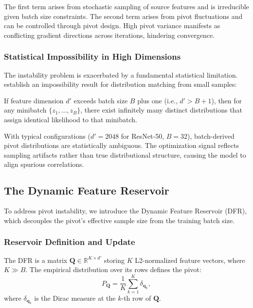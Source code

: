 The first term arises from stochastic sampling of source features and is irreducible given batch size constraints. The second term arises from pivot fluctuations and can be controlled through pivot design. High pivot variance manifests as conflicting gradient directions across iterations, hindering convergence.

\subsubsection{Statistical Impossibility in High Dimensions}

The instability problem is exacerbated by a fundamental statistical limitation. \citet{dong2025distribution} establish an impossibility result for distribution matching from small samples:

\begin{theorem}
\label{thm:impossibility}
If feature dimension $d'$ exceeds batch size $B$ plus one (i.e., $d' > B + 1$), then for any minibatch $\{z_1, \dots, z_B\}$, there exist infinitely many distinct distributions that assign identical likelihood to that minibatch.
\end{theorem}

With typical configurations ($d' = 2048$ for ResNet-50, $B = 32$), batch-derived pivot distributions are statistically ambiguous. The optimization signal reflects sampling artifacts rather than true distributional structure, causing the model to align spurious correlations.

\subsection{The Dynamic Feature Reservoir}
\label{ssec:dfr}

To address pivot instability, we introduce the Dynamic Feature Reservoir (DFR), which decouples the pivot's effective sample size from the training batch size.

\subsubsection{Reservoir Definition and Update}

The DFR is a matrix $\mathbf{Q} \in \mathbb{R}^{K \times d'}$ storing $K$ L2-normalized feature vectors, where $K \gg B$. The empirical distribution over its rows defines the pivot:
\begin{equation}
    P_{\mathbf{Q}} = \frac{1}{K} \sum_{k=1}^{K} \delta_{\mathbf{q}_k},
\end{equation}
where $\delta_{\mathbf{q}_k}$ is the Dirac measure at the $k$-th row of $\mathbf{Q}$.

